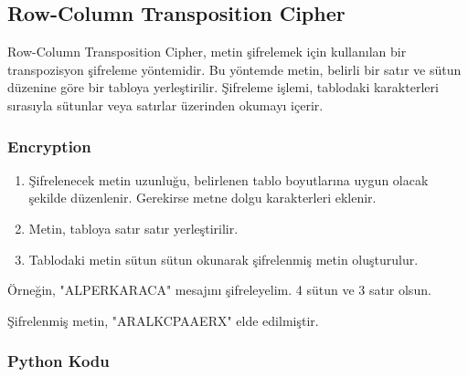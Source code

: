\newpage

\subsection{Row-Column Transposition Cipher}

Row-Column Transposition Cipher, metin şifrelemek için kullanılan bir transpozisyon şifreleme yöntemidir. Bu yöntemde metin, belirli bir satır ve sütun düzenine göre bir tabloya yerleştirilir. Şifreleme işlemi, tablodaki karakterleri sırasıyla sütunlar veya satırlar üzerinden okumayı içerir.

\subsubsection{Encryption}

\begin{enumerate}
    \item Şifrelenecek metin uzunluğu, belirlenen tablo boyutlarına uygun olacak şekilde düzenlenir. Gerekirse metne dolgu karakterleri eklenir.
    \item Metin, tabloya satır satır yerleştirilir.
    \item Tablodaki metin sütun sütun okunarak şifrelenmiş metin oluşturulur.
\end{enumerate}

Örneğin, "ALPERKARACA" mesajını şifreleyelim. 4 sütun ve 3 satır olsun.

\begin{table}[ht]
\centering
{}
\end{table}

Şifrelenmiş metin, "ARALKCPAAERX" elde edilmiştir.

\subsubsection{Python Kodu}

